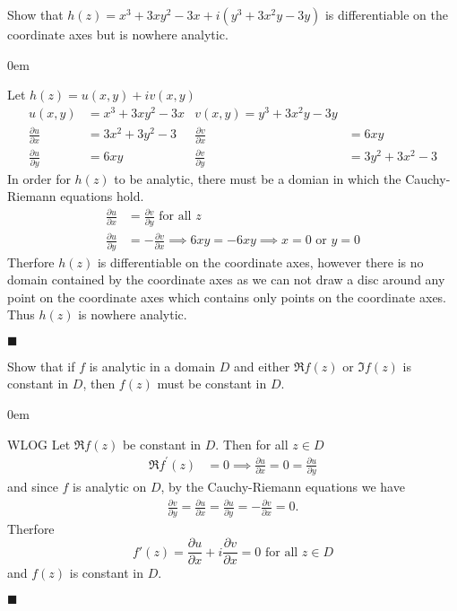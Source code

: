 \documentclass[12pt]{article}
\author{Warren Atkison}
\date{\today}
\renewcommand{\qed}{\hfill$\blacksquare$}
\renewenvironment{proof}{\vspace{1em}\begin{addmargin}[2em]{0em}\begin{newproof}}{\end{newproof}\end{addmargin}\qed}
\newenvironment{exercise}[2][Exercise]{\begin{trivlist}
\item[\hskip \labelsep {\bfseries #1} \hskip \labelsep {\bfseries #2.}]}{\end{trivlist}}
\begin{document}
\fancyhf{}
\fancyhead[R]{\today}
\fancyfoot[R]{\thepage}

\begin{exercise}{2}
	Show that $h(z) = x^3 + 3xy^2 - 3x + i(y^3 + 3x^2y - 3y)$ is differentiable on the coordinate axes but is nowhere analytic.
\end{exercise}
\begin{proof} Let $h(z) = u(x,y) + iv(x,y)$
	\begin{align*}
		u(x,y) &= x^3 + 3xy^2 - 3x & v(x,y) = y^3 + 3x^2y - 3y \\
		\frac{\partial u}{\partial x} &= 3x^2 + 3y^2 - 3 & \frac{\partial v}{\partial x} &= 6xy \\
		\frac{\partial u}{\partial y} &= 6xy & \frac{\partial v}{\partial y} &= 3y^2 + 3x^2 - 3
	\end{align*}	
	In order for $h(z)$ to be analytic, there must be a domian in which the Cauchy-Riemann equations hold.
	\begin{align*}
		\frac{\partial u}{\partial x} &= \frac{\partial v}{\partial y} \text{ for all } z \\
		\frac{\partial u}{\partial y} &= -\frac{\partial v}{\partial x} \implies 6xy = -6xy \implies x = 0 \text{ or } y = 0
	\end{align*}
	Therfore $h(z)$ is differentiable on the coordinate axes, however there is no domain contained by the coordinate axes as we can not draw a disc around any point on the coordinate axes which contains only points on the coordinate axes. Thus $h(z)$ is nowhere analytic.
	\end{proof}
\begin{exercise}{8}
	Show that if $f$ is analytic in a domain $D$ and either $\Re f(z)$ or $\Im f(z)$ is constant in $D$, then $f(z)$ must be constant in $D$.
\end{exercise}
\begin{proof}
	WLOG Let $\Re f(z)$ be constant in $D$. Then for all $z \in D$
	\begin{align*}
		\Re f^{'}(z) &= 0 \implies \frac{\partial u}{\partial x} = 0 = \frac{\partial u}{\partial y}
	\end{align*}
	and since $f$ is analytic on $D$, by the Cauchy-Riemann equations we have
	\begin{align*}
		\frac{\partial v}{\partial y} = \frac{\partial u}{\partial x} = \frac{\partial u}{\partial y} = -\frac{\partial v}{\partial x} = 0.
	\end{align*}
	Therfore
	\[
		f'(z) = \frac{\partial u}{\partial x} + i\frac{\partial v}{\partial x} = 0 \text{ for all } z \in D
	\]
	and $f(z)$ is constant in $D$.
\end{proof}
\end{document}
